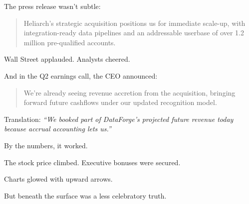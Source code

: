 The press release wasn’t subtle:

\begin{quote}
Heliarch’s strategic acquisition positions us for immediate scale-up, with integration-ready data pipelines and an addressable userbase of over 1.2 million pre-qualified accounts.
\end{quote}

Wall Street applauded. Analysts cheered.  

And in the Q2 earnings call, the CEO announced:

\begin{quote}
We’re already seeing revenue accretion from the acquisition, bringing forward future cashflows under our updated recognition model.
\end{quote}

Translation: \textit{“We booked part of DataForge’s projected future revenue today because accrual accounting lets us.”}

By the numbers, it worked.  

The stock price climbed. Executive bonuses were secured.  

Charts glowed with upward arrows.

But beneath the surface was a less celebratory truth.

